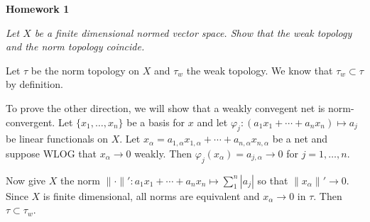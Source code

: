 \documentclass[12pt, reqno]{article}
\theoremstyle{plain}
\theoremstyle{definition}
\theoremstyle{remark}
\renewcommand{\phi}{\varphi}
\begin{document}
\topmargin=-40pt
\renewcommand{\headrulewidth}{1pt}
\renewcommand{\headsep}{20pt}
\thispagestyle{fancy}

{\Huge \bfseries \noindent Homework 1}

\it Let $X$ be a finite dimensional normed vector space. Show that the weak topology and the norm
topology coincide. 
\normalfont

Let $\tau$ be the norm topology on $X$ and $\tau_w$ the weak topology. We know that $\tau_w \subset
\tau$ by definition. 

To prove the other direction, we will show that a weakly convegent net is norm-convergent.
Let $\{x_1, \dots, x_n\}$ be a basis for $x$ and let 
$\phi_j: (a_1x_1 + \cdots + a_n x_n) \mapsto a_j$ be linear functionals on $X$. 
Let $x_\alpha = a_{1,\alpha}x_{1,\alpha} + \cdots + a_{n, \alpha} x_{n, \alpha}$ be a net 
and suppose WLOG that $x_\alpha \rightarrow 0$ weakly. Then $\phi_j(x_\alpha) = a_{j, \alpha} \rightarrow 0$ 
for $j = 1, \dots, n$. 

Now give $X$ the norm $\|\cdot \|': a_1 x_1 + \cdots + a_n x_n \mapsto \sum_1^n |a_j|$ so that 
$\|x_\alpha\|' \rightarrow 0$. Since $X$ is finite dimensional, all norms are equivalent and $x_\alpha \rightarrow 0$
in $\tau$. Then $\tau \subset \tau_w$.
\end{document}
